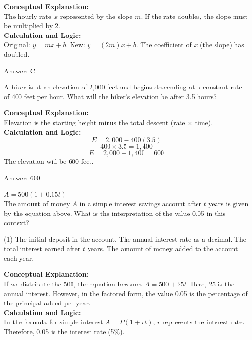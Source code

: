 \documentclass[11pt,paper=a4,answers]{exam}
\begin{document}
\begin{questions}
\begin{solution}
\textbf{Conceptual Explanation:} \\
The hourly rate is represented by the slope $m$. If the rate doubles, the slope must be multiplied by 2.
\\[10pt]
\textbf{Calculation and Logic:} \\
Original: $y = mx + b$. 
New: $y = (2m)x + b$. 
The coefficient of $x$ (the slope) has doubled.

\vspace{15pt}
Answer: \colorbox{yellow!100}{C}
\end{solution}

\question
A hiker is at an elevation of 2,000 feet and begins descending at a constant rate of 400 feet per hour. What will the hiker's elevation be after 3.5 hours?

\begin{solution}
\textbf{Conceptual Explanation:} \\
Elevation is the starting height minus the total descent (rate $\times$ time).
\\[10pt]
\textbf{Calculation and Logic:} \\
\[E = 2,000 - 400(3.5)\]
\[400 \times 3.5 = 1,400\]
\[E = 2,000 - 1,400 = 600\]
The elevation will be 600 feet.

\vspace{15pt}
Answer: \colorbox{yellow!100}{600}
\end{solution}

\question
$A = 500(1 + 0.05t)$ \\
The amount of money $A$ in a simple interest savings account after $t$ years is given by the equation above. What is the interpretation of the value 0.05 in this context?
\begin{tasks}(1)
    \task The initial deposit in the account.
    \task The annual interest rate as a decimal.
    \task The total interest earned after $t$ years.
    \task The amount of money added to the account each year.
\end{tasks}

\begin{solution}
\textbf{Conceptual Explanation:} \\
If we distribute the 500, the equation becomes $A = 500 + 25t$. Here, 25 is the annual interest. However, in the factored form, the value 0.05 is the percentage of the principal added per year.
\\[10pt]
\textbf{Calculation and Logic:} \\
In the formula for simple interest $A = P(1 + rt)$, $r$ represents the interest rate. Therefore, 0.05 is the interest rate (5\%).


\end{solution}
\end{questions}
\end{document}
